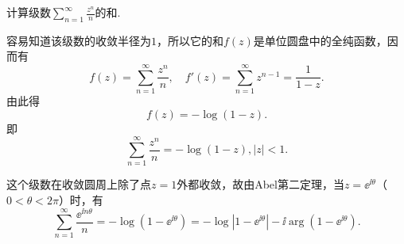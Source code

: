 \begin{example}\label{exam4.2.10}
计算级数$\sum_{n=1}^\infty\frac{z^n}n$的和.
\end{example}
\begin{solution}
容易知道该级数的收敛半径为$1$，所以它的和$f(z)$是单位圆盘中的全纯函数，因而有
\[f(z)=\sum_{n=1}^\infty\frac{z^n}n,\quad f'(z)=\sum_{n=1}^\infty z^{n-1}=\frac1{1-z}.\]
由此得
\[f(z)=-\log(1-z).\]
即
\begin{equation*}
\sum_{n=1}^\infty\frac{z^n}n=-\log(1-z),|z|<1.
\end{equation*}
\end{solution}

这个级数在收敛圆周上除了点$z=1$外都收敛，故由Abel第二定理，当$z=\ee^{\ii\theta}$（$0<\theta<2\pi$）时，有
\begin{equation}\label{eq4.2.5}
\sum_{n=1}^\infty\frac{\ee^{\ii n\theta}}n=-\log(1-\ee^{\ii\theta})
=-\log|1-\ee^{\ii\theta}|-\ii\arg(1-\ee^{\ii\theta}).
\end{equation}

